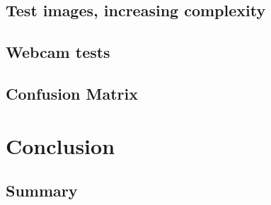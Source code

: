 \documentclass[a4paper,12pt,notitlepage]{article}
\begin{document}
	\subsection{Test images, increasing complexity}
	\subsection{Webcam tests}
	\subsection{Confusion Matrix}
\pagebreak
\section{Conclusion}
	\subsection{Summary}
\end{document}
